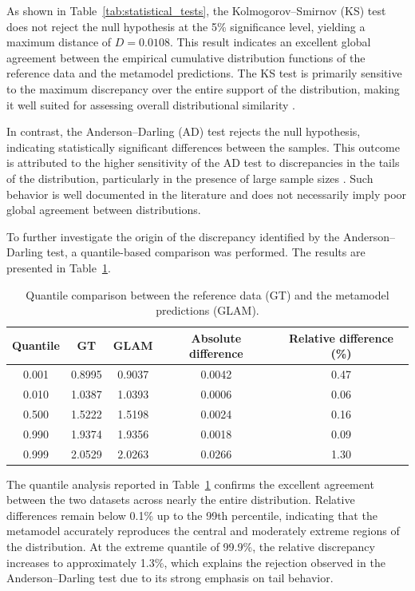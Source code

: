 As shown in Table~\ref{tab:statistical_tests}, the Kolmogorov--Smirnov (KS) test does not reject the null hypothesis at the 5\% significance level, yielding a maximum distance of $D = 0.0108$. This result indicates an excellent global agreement between the empirical cumulative distribution functions of the reference data and the metamodel predictions. The KS test is primarily sensitive to the maximum discrepancy over the entire support of the distribution, making it well suited for assessing overall distributional similarity \cite{massey1951ks}.

In contrast, the Anderson--Darling (AD) test rejects the null hypothesis, indicating statistically significant differences between the samples. This outcome is attributed to the higher sensitivity of the AD test to discrepancies in the tails of the distribution, particularly in the presence of large sample sizes \cite{anderson1952ad, scholz1987ad}. Such behavior is well documented in the literature and does not necessarily imply poor global agreement between distributions.

To further investigate the origin of the discrepancy identified by the Anderson--Darling test, a quantile-based comparison was performed. The results are presented in Table~\ref{tab:quantile_comparison}.

\begin{table}[H]
\centering
\caption{Quantile comparison between the reference data (GT) and the metamodel predictions (GLAM).}
\label{tab:quantile_comparison}
\begin{tabular}{ccccc}
\hline
Quantile & GT & GLAM & Absolute difference & Relative difference (\%) \\
\hline
0.001 & 0.8995 & 0.9037 & 0.0042 & 0.47 \\
0.010 & 1.0387 & 1.0393 & 0.0006 & 0.06 \\
0.500 & 1.5222 & 1.5198 & 0.0024 & 0.16 \\
0.990 & 1.9374 & 1.9356 & 0.0018 & 0.09 \\
0.999 & 2.0529 & 2.0263 & 0.0266 & 1.30 \\
\hline
\end{tabular}
\end{table}

The quantile analysis reported in Table~\ref{tab:quantile_comparison} confirms the excellent agreement between the two datasets across nearly the entire distribution. Relative differences remain below 0.1\% up to the 99th percentile, indicating that the metamodel accurately reproduces the central and moderately extreme regions of the distribution. At the extreme quantile of 99.9\%, the relative discrepancy increases to approximately 1.3\%, which explains the rejection observed in the Anderson--Darling test due to its strong emphasis on tail behavior.

